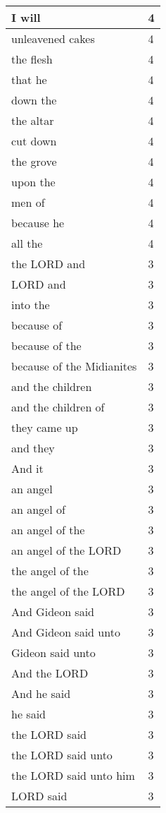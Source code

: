 \begin{center}
\begin{longtable}{|p{3.0in}|p{0.5in}|}
I will & 4\\ \hline 
unleavened cakes & 4\\ \hline 
the flesh & 4\\ \hline 
that he & 4\\ \hline 
down the & 4\\ \hline 
the altar & 4\\ \hline 
cut down & 4\\ \hline 
the grove & 4\\ \hline 
upon the & 4\\ \hline 
men of & 4\\ \hline 
because he & 4\\ \hline 
all the & 4\\ \hline 
the LORD and & 3\\ \hline 
LORD and & 3\\ \hline 
into the & 3\\ \hline 
because of & 3\\ \hline 
because of the & 3\\ \hline 
because of the Midianites & 3\\ \hline 
and the children & 3\\ \hline 
and the children of & 3\\ \hline 
they came up & 3\\ \hline 
and they & 3\\ \hline 
And it & 3\\ \hline 
an angel & 3\\ \hline 
an angel of & 3\\ \hline 
an angel of the & 3\\ \hline 
an angel of the LORD & 3\\ \hline 
the angel of the & 3\\ \hline 
the angel of the LORD & 3\\ \hline 
And Gideon said & 3\\ \hline 
And Gideon said unto & 3\\ \hline 
Gideon said unto & 3\\ \hline 
And the LORD & 3\\ \hline 
And he said & 3\\ \hline 
he said & 3\\ \hline 
the LORD said & 3\\ \hline 
the LORD said unto & 3\\ \hline 
the LORD said unto him & 3\\ \hline 
LORD said & 3\\ \hline 

\end{longtable}
\end{center}
